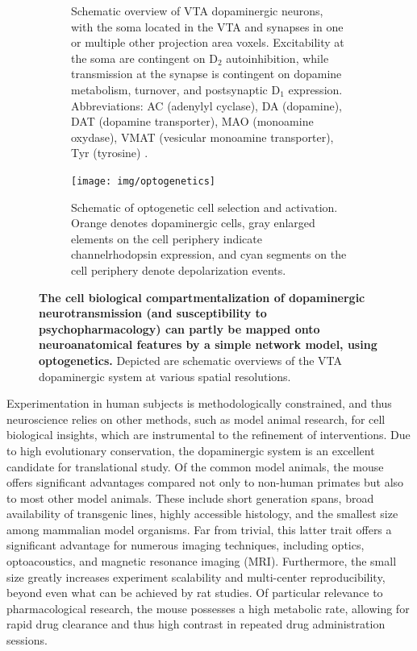 \begin{sansmath}
\begin{figure}[h!]
\begin{subfigure}{.985\textwidth}
		\caption{
			Schematic overview of VTA dopaminergic neurons, with the soma located in the VTA and synapses in one or multiple other projection area voxels.
			Excitability at the soma are contingent on $\mathrm{D_2}$ autoinhibition, while transmission at the synapse is contingent on dopamine metabolism, turnover, and postsynaptic $\mathrm{D_1}$ expression.
			Abbreviations: AC (adenylyl cyclase), DA (dopamine), DAT (dopamine transporter), MAO (monoamine oxydase), VMAT (vesicular monoamine transporter), Tyr (tyrosine) \cite{Torres2003}.
			}
		\label{fig:cm}
	\end{subfigure}
	\begin{subfigure}{.985\textwidth}
		\centering
		\vspace{.5em}
		\texttt{[image: img/optogenetics]}
		\caption{
			Schematic of optogenetic cell selection and activation.
			Orange denotes dopaminergic cells, gray enlarged elements on the cell periphery indicate channelrhodopsin expression, and cyan segments on the cell periphery denote depolarization events.
			}
		\label{fig:og}
	\end{subfigure}
	\caption{
		\textbf{The cell biological compartmentalization of dopaminergic neurotransmission (and susceptibility to psychopharmacology) can partly be mapped onto neuroanatomical features by a simple network model, using optogenetics.}
		Depicted are schematic overviews of the VTA dopaminergic system at various spatial resolutions.
		}
	\label{fig:m}
\end{figure}
\end{sansmath}

Experimentation in human subjects is methodologically constrained, and thus neuroscience relies on other methods, such as model animal research, for cell biological insights, which are instrumental to the refinement of interventions.
Due to high evolutionary conservation, the dopaminergic system is an excellent candidate for translational study.
Of the common model animals, the mouse offers significant advantages compared not only to non-human primates but also to most other model animals.
These include short generation spans, broad availability of transgenic lines, highly accessible histology, and the smallest size among mammalian model organisms.
Far from trivial, this latter trait offers a significant advantage for numerous imaging techniques, including optics, optoacoustics, and magnetic resonance imaging (MRI).
Furthermore, the small size greatly increases experiment scalability and multi-center reproducibility, beyond even what can be achieved by rat studies.
Of particular relevance to pharmacological research, the mouse possesses a high metabolic rate, allowing for rapid drug clearance and thus high contrast in repeated drug administration sessions.

